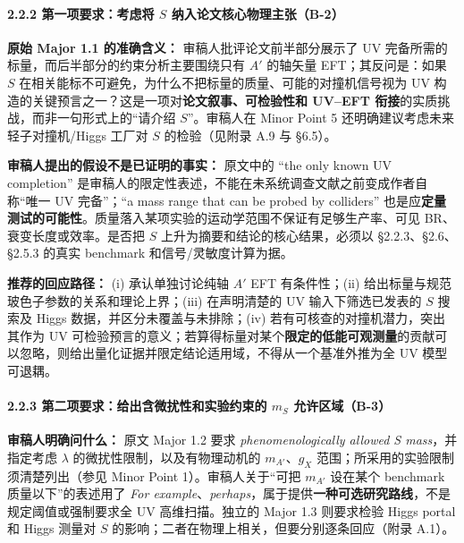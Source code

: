 \documentclass[
  chinese,
  UTF8]{ctexart}
\begin{document}
\paragraph{\texorpdfstring{2.2.2 第一项要求：考虑将 \(S\)
纳入论文核心物理主张（B-2）}{2.2.2 第一项要求：考虑将 S 纳入论文核心物理主张（B-2）}}\label{ux7b2cux4e00ux9879ux8981ux6c42ux8003ux8651ux5c06-s-ux7eb3ux5165ux8bbaux6587ux6838ux5fc3ux7269ux7406ux4e3bux5f20b-2}

\textbf{原始 Major 1.1 的准确含义：} 审稿人批评论文前半部分展示了 UV
完备所需的标量，而后半部分的约束分析主要围绕只有 \(A'\) 的轴矢量
EFT；其反问是：如果 \(S\)
在相关能标不可避免，为什么不把标量的质量、可能的对撞机信号视为 UV
构造的关键预言之一？这是一项对\textbf{论文叙事、可检验性和 UV--EFT
衔接}的实质挑战，而非一句形式上的``请介绍 \(S\)''。审稿人在 Minor Point
5 还明确建议考虑未来轻子对撞机/Higgs 工厂对 \(S\) 的检验（见附录 A.9 与
§6.5）。

\textbf{审稿人提出的假设不是已证明的事实：} 原文中的 ``the only known UV
completion''
是审稿人的限定性表述，不能在未系统调查文献之前变成作者自称``唯一 UV
完备''；``a mass range that can be probed by colliders''
也是应\textbf{定量测试的可能性}。质量落入某项实验的运动学范围不保证有足够生产率、可见
BR、衰变长度或效率。是否把 \(S\) 上升为摘要和结论的核心结果，必须以
§2.2.3、§2.6、§2.5.3 的真实 benchmark 和信号/灵敏度计算为据。

\textbf{推荐的回应路径：} (i) 承认单独讨论纯轴 \(A'\) EFT 有条件性；(ii)
给出标量与规范玻色子参数的关系和理论上界；(iii) 在声明清楚的 UV
输入下筛选已发表的 \(S\) 搜索及 Higgs 数据，并区分未覆盖与未排除；(iv)
若有可核查的对撞机潜力，突出其作为 UV
可检验预言的意义；若算得标量对某个\textbf{限定的低能可观测量}的贡献可以忽略，则给出量化证据并限定结论适用域，不得从一个基准外推为全
UV 模型可退耦。

\paragraph{\texorpdfstring{2.2.3 第二项要求：给出含微扰性和实验约束的
\(m_S\)
允许区域（B-3）}{2.2.3 第二项要求：给出含微扰性和实验约束的 m\_S 允许区域（B-3）}}\label{ux7b2cux4e8cux9879ux8981ux6c42ux7ed9ux51faux542bux5faeux6270ux6027ux548cux5b9eux9a8cux7ea6ux675fux7684-m_s-ux5141ux8bb8ux533aux57dfb-3}

\textbf{审稿人明确问什么：} 原文 Major 1.2 要求 \emph{phenomenologically
allowed S mass}，并指定考虑 \(\lambda\) 的微扰性限制，以及有物理动机的
\(m_{A'}\)、\(g_X\) 范围；所采用的实验限制须清楚列出（参见 Minor Point
1）。审稿人关于``可把 \(m_{A'}\) 设在某个 benchmark 质量以下''的表述用了
\emph{For
example}、\emph{perhaps}，属于提供\textbf{一种可选研究路线}，不是规定阈值或强制要求全
UV 高维扫描。独立的 Major 1.3 则要求检验 Higgs portal 和 Higgs 测量对
\(S\) 的影响；二者在物理上相关，但要分别逐条回应（附录 A.1）。
\end{document}

